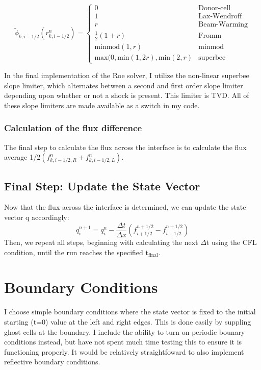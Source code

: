\documentclass{article}
\begin{document}
\[
\tilde{\phi}_{k,i-1/2}\left(r^{n}_{k,i-1/2}\right) =
    \begin{cases}
    0 & \text{Donor-cell} \\
    1 & \text{Lax-Wendroff} \\
    r & \text{Beam-Warming}\\
    \frac{1}{2}\left(1 + r\right) & \text{Fromm}\\
    \text{minmod}(1,r) & \text{minmod} \\
    \text{max}(0, \text{min}(1,2r), \text{min}(2,r) & \text{superbee}    
    \end{cases}
\]

In the final implementation of the Roe solver, I utilize the 
non-linear superbee slope limiter, 
which alternates between a second and first order slope limiter depending upon
whether or not a shock is present. This limiter is TVD. All of these slope
limiters are made available as a switch in my code.


\subsubsection{Calculation of the flux difference}
The final step to calculate the flux across the interface is to
calculate the flux average 
1/2$\left(f_{k,i-1/2,R}^n + f_{k,i-1/2,L}^n\right)$.

\subsection{Final Step: Update the State Vector}
Now that the flux across the interface is determined, we can update
the state vector q accordingly: 
\begin{equation}
\label{eq:update q}
q^{n+1}_i = q^n_i - \frac{\Delta t}{\Delta x}
             \left(f_{i+1/2}^{n+1/2} - f_{i-1/2}^{n+1/2}\right)
\end{equation}
Then, we repeat all steps, beginning with calculating the next
$\Delta$t using the CFL condition, until the run reaches the
specified t$_{\text{final}}$.

\section{Boundary Conditions}
I choose simple boundary conditions where the state vector is fixed to the
initial starting (t=0) value at the left and right edges. This is done easily
by suppling ghost cells at the boundary. I include the ability to turn on 
periodic bounary conditions instead, but have not spent much time testing this
to ensure it is functioning properly. It would be relatively straightfoward
to also implement reflective boundary conditions.
\end{document}
